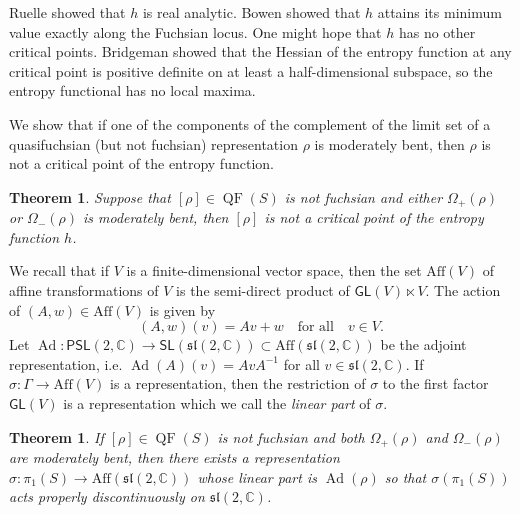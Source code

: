 \documentclass{amsart}
\theoremstyle{plain}
\newtheorem{theorem}[proposition]{Theorem}
\theoremstyle{definition}
\theoremstyle{remark}
\newcommand{\CC}{\mathbb C}
\newcommand{\Ad}{\operatorname{Ad}}
\newcommand{\QF}{\operatorname{QF}}
\newcommand{\SL}{\mathsf{SL}}
\newcommand{\GL}{\mathsf{GL}}
\newcommand{\C}{\mathbb C}
\renewcommand{\sl}{\mathfrak{sl}}
\newcommand{\<}{\left <}
\renewcommand{\>}{\right >}
\renewcommand{\C}{\mathbb C}
\begin{document}
Ruelle \cite{ruelle} showed that $h$ is real analytic. Bowen \cite{bowen} showed that $h$ attains its minimum value
exactly along the Fuchsian locus. One might hope that $h$ has no other critical points. Bridgeman \cite{bridgeman-wp}
showed that  the Hessian of the entropy function at any critical point is positive definite on at least a half-dimensional subspace, so the entropy 
functional has no local maxima. 

We show that if one of the components of the complement  of the limit set of a quasifuchsian (but not fuchsian) representation $\rho$
is moderately bent, then $\rho$ is not a critical point of the entropy function.


\begin{theorem}
\label{Main Theorem 2}
Suppose that  $[\rho]\in \QF(S)$ is  not fuchsian and either $\Omega_+(\rho)$ or $\Omega_-(\rho)$ is moderately bent,
then $[\rho]$ is not a critical point of the entropy function $h$.
\end{theorem}

\medskip

We recall that if $V$ is a finite-dimensional vector space, then the set  $\mathrm{Aff}(V)$ of affine transformations of $V$  is 
the semi-direct product of $\mathsf{GL}(V)\ltimes V$. The action of $(A,w)\in \mathrm{Aff}(V)$ is given by
$$(A,w)(v)=Av+w\quad\text{for all}\quad v\in V.$$
Let $\Ad:\mathsf{PSL}(2,\mathbb C)\to\SL(\mathfrak{sl}(2,\CC))\subset\mathrm{Aff}(\sl(2,\C))$ be the adjoint representation,
i.e. $\Ad(A)(v)=AvA^{-1}$ for all $v\in\sl(2,\C)$. If $\sigma:\Gamma\to\mathrm{Aff}(V)$ is a representation, then the restriction of
$\sigma$ to the first factor $\GL(V)$ is a representation which we call the {\em linear part} of $\sigma$.




\begin{theorem}
\label{Main Theorem 3}
If $[\rho]\in \QF(S)$ is not fuchsian and both $\Omega_+(\rho)$ and $\Omega_-(\rho)$ are moderately bent,
then there exists a representation $\sigma:\pi_1(S)\to\mathrm{Aff}(\sl(2,\mathbb C))$  whose linear part is $\Ad(\rho)$
so that $\sigma(\pi_1(S))$ acts properly discontinuously on $\sl(2,\C)$.
\end{theorem}
\end{document}
